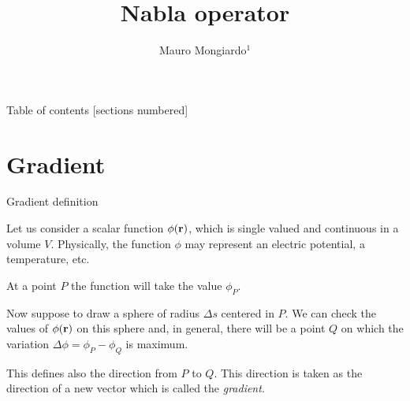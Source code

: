 \documentclass[handout,10pt]{beamer}
\title{Nabla operator}
\date{}
\author{ Mauro Mongiardo$^1$}
\institute{ $^1$ Department of Engineering, University of Perugia, Perugia, Italy.
}
\begin{document}
\maketitle

\begin{frame}{Table of contents}
  [sections numbered]
  \tableofcontents[hideallsubsections]
\end{frame}


\def\EMspectrum{\centering
\texttt{[image: EMspectrum]}}

\def\atmatt{\centering
\texttt{[image: atmatt3.eps]}}


%



\section{Gradient}


\begin{frame}[shrink=00]{Gradient definition}


Let us consider a \alert{scalar  function $\phi(\mathbf{r})$}, which is single valued and continuous in a volume $V$. 
Physically, the function $\phi$ may represent an electric potential, a temperature, etc. 

At a point $P$ the function will take the value $\phi_P$. 
\pause

Now suppose to \alert{draw a sphere of radius $\Delta s$ centered in $P$}. We can check the values of $\phi(\mathbf{r})$ on this sphere and, in general, there will be a point $Q$ on which the variation $\Delta \phi = \phi_P - \phi_Q$ is maximum. 

\pause

This defines also the direction from $P$ to $Q$. This direction is taken as the \alert{direction} of a new vector which is called the \alert{\emph{gradient}}. 




\end{frame}

\end{document}
